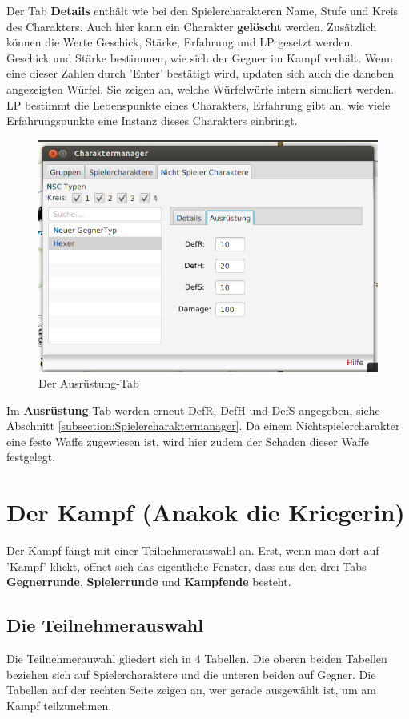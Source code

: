 \documentclass[11pt, a4paper, german]{article}
\begin{document}
Der Tab \textbf{Details} enthält wie bei den Spielercharakteren Name, Stufe und Kreis des Charakters. Auch hier kann ein Charakter \textbf{gelöscht} werden. 
Zusätzlich können die Werte Geschick, Stärke, Erfahrung und LP gesetzt werden.\\
 Geschick und Stärke bestimmen, wie sich der Gegner im Kampf verhält. Wenn eine dieser Zahlen durch 'Enter' bestätigt wird, updaten sich auch die daneben angezeigten Würfel. 
Sie zeigen an, welche Würfelwürfe intern simuliert werden. LP bestimmt die Lebenspunkte eines Charakters, Erfahrung gibt an, wie viele Erfahrungspunkte eine Instanz dieses Charakters einbringt.\\
\begin{figure}
\centering
\includegraphics[width=1\linewidth]{Bilder/Nichtspielertypmanager2}
\caption{Der Ausrüstung-Tab}
\label{fig:Nichtspielertypmanager2}
\end{figure}

Im \textbf{Ausrüstung}-Tab werden erneut DefR, DefH und DefS angegeben, siehe Abschnitt \ref{subsection:Spielercharaktermanager}. 
Da einem Nichtspielercharakter eine feste Waffe zugewiesen ist, wird hier zudem der Schaden dieser Waffe festgelegt.

\clearpage
\section{Der Kampf (Anakok die Kriegerin)}\label{Abschnitt:Kampf}
Der Kampf fängt mit einer Teilnehmerauswahl an. Erst, wenn man dort auf 'Kampf' klickt, öffnet sich das eigentliche Fenster, dass aus den drei Tabs \textbf{Gegnerrunde}, \textbf{Spielerrunde} und \textbf{Kampfende} besteht.
\subsection{Die Teilnehmerauswahl}
Die Teilnehmerauwahl gliedert sich in 4 Tabellen. Die oberen beiden Tabellen beziehen sich auf Spielercharaktere und die unteren beiden auf Gegner. Die Tabellen auf der rechten Seite zeigen an, wer gerade ausgewählt ist, um am Kampf teilzunehmen.\\
\end{document}
